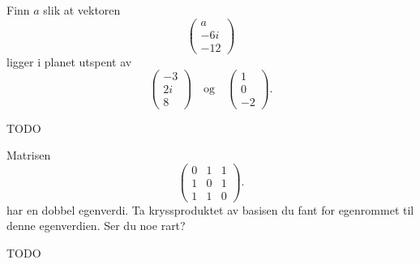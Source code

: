 \begin{oppgave}
Finn $a$ slik at vektoren 
\[
\begin{pmatrix}
a \\ -6i \\ -12 
\end{pmatrix}
\]
ligger i planet utspent av 
\[
\begin{pmatrix}
-3 \\ 2i \\ 8 
\end{pmatrix}
\quad 
\text{og}
\quad 
\begin{pmatrix}
1 \\ 0 \\ -2 
\end{pmatrix}.
\]

\end{oppgave}


\begin{losning}
TODO
\end{losning}


\begin{oppgave}
Matrisen
\[
\begin{pmatrix}
0 & 1 & 1 \\ 1 & 0 & 1 \\ 1 & 1 & 0 
\end{pmatrix}.
\]
har en dobbel egenverdi. Ta kryssproduktet av basisen du fant for egenrommet til denne egenverdien. Ser du noe rart?
\end{oppgave}

\begin{losning}
TODO
\end{losning}

